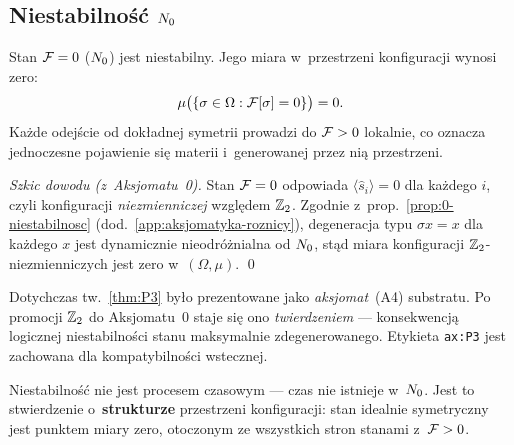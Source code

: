\subsection{Niestabilno\'s\'c $N_0$}\label{ssec:niestabilnosc}

\begin{theorem}%
\label{thm:P3}\label{ax:P3}
Stan $\mathcal{F} = 0$ ($N_0$) jest niestabilny. Jego miara
w~przestrzeni konfiguracji wynosi zero:
\begin{equation}
    \mu\bigl(\{\sigma \in \Omega : \mathcal{F}[\sigma] = 0\}\bigr) = 0.
\end{equation}
Ka\.zde odej\'scie od dok\l{}adnej symetrii prowadzi do $\mathcal{F} > 0$
lokalnie, co oznacza jednoczesne pojawienie si\k{e} materii
i~generowanej przez ni\k{a} przestrzeni.
\end{theorem}

\begin{proof}[Szkic dowodu (z~Aksjomatu~0)]
Stan $\mathcal{F} = 0$ odpowiada $\langle\hat{s}_i\rangle = 0$ dla
ka\.zdego $i$, czyli konfiguracji \emph{niezmienniczej} wzgl\k{e}dem
$\mathbb{Z}_2$. Zgodnie z~prop.~\ref{prop:0-niestabilnosc}
(dod.~\ref{app:aksjomatyka-roznicy}), degeneracja typu
$\sigma x = x$ dla ka\.zdego $x$ jest dynamicznie nieodr\'o\.znialna
od $N_0$, st\k{a}d miara konfiguracji $\mathbb{Z}_2$-niezmienniczych
jest zero w~$(\Omega, \mu)$. \qed
\end{proof}

\begin{remark}\label{rem:P3-status}
Dotychczas tw.~\ref{thm:P3} by\l{}o prezentowane jako
\emph{aksjomat}~(A4) substratu. Po promocji $\mathbb{Z}_2$ do Aksjomatu~0
staje si\k{e} ono \emph{twierdzeniem} --- konsekwencj\k{a}
logicznej niestabilno\'sci stanu maksymalnie zdegenerowanego.
Etykieta \texttt{ax:P3} jest zachowana dla kompatybilno\'sci
wstecznej.
\end{remark}

Niestabilno\'s\'c nie jest procesem czasowym --- czas nie istnieje
w~$N_0$. Jest to stwierdzenie o~\textbf{strukturze} przestrzeni
konfiguracji: stan idealnie symetryczny jest punktem miary zero,
otoczonym ze wszystkich stron stanami z~$\mathcal{F} > 0$.

